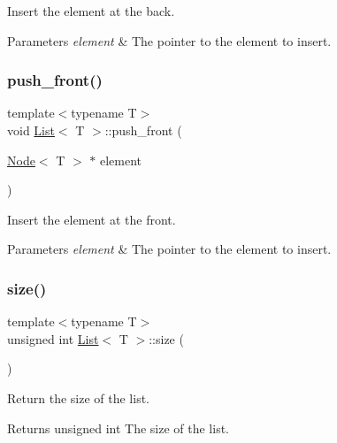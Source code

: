 Insert the element at the back. 


\begin{DoxyParams}{Parameters}
{\em element} & The pointer to the element to insert. \\
\hline
\end{DoxyParams}
\mbox{\label{classList_aeb009afd4f0f626603455d5ee9e3dfc3}} 
\subsubsection{\texorpdfstring{push\+\_\+front()}{push\_front()}}
{\footnotesize\ttfamily template$<$typename T$>$ \\
void \hyperlink{classList}{List}$<$ T $>$\+::push\+\_\+front (\begin{DoxyParamCaption}\item[{\hyperlink{structNode}{Node}$<$ T $>$ $\ast$}]{element }\end{DoxyParamCaption})\hspace{0.3cm}{\ttfamily [inline]}}



Insert the element at the front. 


\begin{DoxyParams}{Parameters}
{\em element} & The pointer to the element to insert. \\
\hline
\end{DoxyParams}
\mbox{\label{classList_ad908ab5cf19370fcdf61cf1927e5e8f5}} 
\subsubsection{\texorpdfstring{size()}{size()}}
{\footnotesize\ttfamily template$<$typename T$>$ \\
unsigned int \hyperlink{classList}{List}$<$ T $>$\+::size (\begin{DoxyParamCaption}{ }\end{DoxyParamCaption})\hspace{0.3cm}{\ttfamily [inline]}}



Return the size of the list. 

\begin{DoxyReturn}{Returns}
unsigned int The size of the list. 
\end{DoxyReturn}


